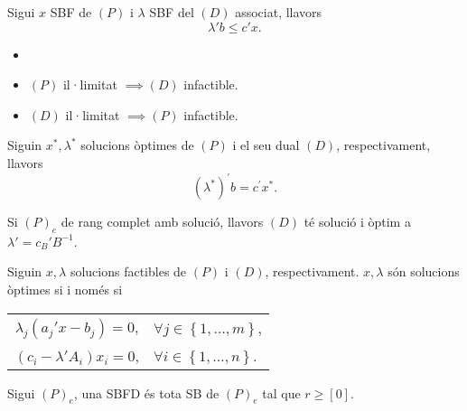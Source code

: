 \begin{teo}
    Sigui $x$ SBF de $\left(P\right)$ i $\lambda$ SBF del $\left(D\right)$ associat, llavors
    \[ \lambda' b\leq c'x. \]
\end{teo}
\begin{col}
    \begin{itemize}
        \item[]
        \item $\left(P\right)$ il·limitat $\implies \left(D\right)$ infactible.
        \item $\left(D\right)$ il·limitat $\implies \left(P\right)$ infactible.
    \end{itemize}
\end{col}
\begin{teo}
    Siguin $x^*, \lambda^*$ solucions òptimes de $\left(P\right)$ i el seu dual $\left(D\right)$, respectivament, llavors
    \[ \left(\lambda^*\right)^\prime b = c^\prime x^*.\]
\end{teo}
\begin{col}
    Si $\left(P\right)_e$ de rang complet amb solució, llavors $\left(D\right)$ té solució i òptim a $\lambda' = c_B'B^{-1}$.
\end{col}
\begin{teo}
    Siguin $x, \lambda$ solucions factibles de $\left(P\right)$ i $\left(D\right)$, respectivament. $x, \lambda$ són solucions òptimes si i només si
    \begin{center}
        \begin{tabular}{cl}
            $\lambda_j \left(a_j'x - b_j\right) = 0$, & $\forall j \in \left\{1, \dots, m\right\}$, \\
            $\left(c_i - \lambda'A_i\right) x_i = 0$, & $\forall i \in \left\{1, \dots, n\right\}$.
        \end{tabular}
    \end{center}
\end{teo}
\begin{defi}
    Sigui $\left(P\right)_e$, una SBFD és tota SB de $\left(P\right)_e$ tal que $r \geq \left[0\right]$.
\end{defi}
